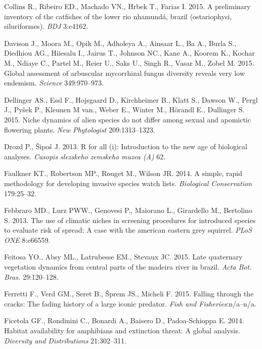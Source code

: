 \documentclass[author-year, review, 11pt]{components/elsarticle} %
\begin{document}
\hypertarget{ref-Collins_2015}{}
Collins R., Ribeiro ED., Machado VN., Hrbek T., Farias I. 2015. A
preliminary inventory of the catfishes of the lower rio nhamundá, brazil
(ostariophysi, siluriformes). \emph{BDJ} 3:e4162.

\hypertarget{ref-Davison_2015}{}
Davison J., Moora M., Opik M., Adholeya A., Ainsaar L., Ba A., Burla S.,
Diedhiou AG., Hiiesalu I., Jairus T., Johnson NC., Kane A., Koorem K.,
Kochar M., Ndiaye C., Partel M., Reier U., Saks U., Singh R., Vasar M.,
Zobel M. 2015. Global assessment of arbuscular mycorrhizal fungus
diversity reveals very low endemism. \emph{Science} 349:970--973.

\hypertarget{ref-Dellinger_2015}{}
Dellinger AS., Essl F., Hojsgaard D., Kirchheimer B., Klatt S., Dawson
W., Pergl J., Pyšek P., Kleunen M van., Weber E., Winter M., Hörandl E.,
Dullinger S. 2015. Niche dynamics of alien species do not differ among
sexual and apomictic flowering plants. \emph{New Phytologist}
209:1313--1323.

\hypertarget{ref-Drozd_2013}{}
Drozd P., Šipoš J. 2013. R for all (i): Introduction to the new age of
biological analyses. \emph{Casopis slezskeho zemskeho muzea (A)} 62.

\hypertarget{ref-Faulkner_2014}{}
Faulkner KT., Robertson MP., Rouget M., Wilson JR. 2014. A simple, rapid
methodology for developing invasive species watch lists.
\emph{Biological Conservation} 179:25--32.

\hypertarget{ref-Di_Febbraro_2013}{}
Febbraro MD., Lurz PWW., Genovesi P., Maiorano L., Girardello M.,
Bertolino S. 2013. The use of climatic niches in screening procedures
for introduced species to evaluate risk of spread: A case with the
american eastern grey squirrel. \emph{PLoS ONE} 8:e66559.

\hypertarget{ref-Feitosa_2015}{}
Feitosa YO., Absy ML., Latrubesse EM., Stevaux JC. 2015. Late quaternary
vegetation dynamics from central parts of the madeira river in brazil.
\emph{Acta Bot. Bras.} 29:120--128.

\hypertarget{ref-Ferretti_2015}{}
Ferretti F., Verd GM., Seret B., Šprem JS., Micheli F. 2015. Falling
through the cracks: The fading history of a large iconic predator.
\emph{Fish and Fisheries}:n/a--n/a.

\hypertarget{ref-Ficetola_2014}{}
Ficetola GF., Rondinini C., Bonardi A., Baisero D., Padoa-Schioppa E.
2014. Habitat availability for amphibians and extinction threat: A
global analysis. \emph{Diversity and Distributions} 21:302--311.
\end{document}
